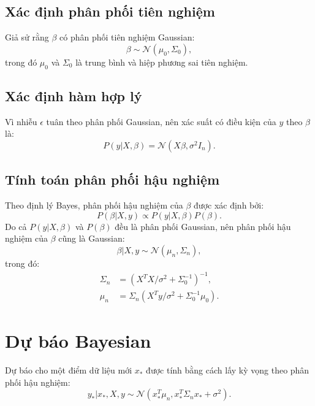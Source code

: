 \subsection{Xác định phân phối tiên nghiệm}
Giả sử rằng $\beta$ có phân phối tiên nghiệm Gaussian:
\begin{equation}
    \beta \sim \mathcal{N}(\mu_0, \Sigma_0),
\end{equation}
trong đó $\mu_0$ và $\Sigma_0$ là trung bình và hiệp phương sai tiên nghiệm.

\subsection{Xác định hàm hợp lý}
Vì nhiễu $\epsilon$ tuân theo phân phối Gaussian, nên xác suất có điều kiện của $y$ theo $\beta$ là:
\begin{equation}
    P(y | X, \beta) = \mathcal{N}(X\beta, \sigma^2 I_n).
\end{equation}

\subsection{Tính toán phân phối hậu nghiệm}
Theo định lý Bayes, phân phối hậu nghiệm của $\beta$ được xác định bởi:
\begin{equation}
    P(\beta | X, y) \propto P(y | X, \beta) P(\beta).
\end{equation}
Do cả $P(y | X, \beta)$ và $P(\beta)$ đều là phân phối Gaussian, nên phân phối hậu nghiệm của $\beta$ cũng là Gaussian:
\begin{equation}
    \beta | X, y \sim \mathcal{N}(\mu_n, \Sigma_n),
\end{equation}
trong đó:
\begin{align}
    \Sigma_n &= (X^T X / \sigma^2 + \Sigma_0^{-1})^{-1}, \\
    \mu_n &= \Sigma_n (X^T y / \sigma^2 + \Sigma_0^{-1} \mu_0).
\end{align}

\section{Dự báo Bayesian}
Dự báo cho một điểm dữ liệu mới $x_*$ được tính bằng cách lấy kỳ vọng theo phân phối hậu nghiệm:
\begin{equation}
    y_* | x_*, X, y \sim \mathcal{N}(x_*^T \mu_n, x_*^T \Sigma_n x_* + \sigma^2).
\end{equation}

